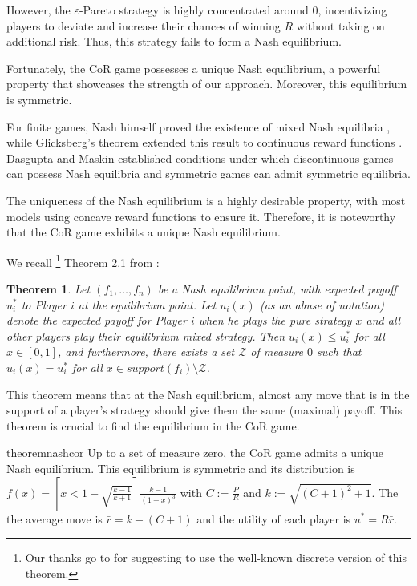 \documentclass[preprint,12pt,authoryear,doubleblind]{elsarticle}
\newtheorem{theorem}{Theorem}[section]
\theoremstyle{definition}
\newcommand{\identifier}{\censor}
\newcommand{\identifier}{}
\begin{document}
However, the $\varepsilon$-Pareto strategy is highly concentrated around $0$, incentivizing players to deviate and increase their chances of winning $R$ without taking on additional risk. Thus, this strategy fails to form a Nash equilibrium.

Fortunately, the CoR game possesses a unique Nash equilibrium, a powerful property that showcases the strength of our approach. Moreover, this equilibrium is symmetric.

For finite games, Nash himself proved the existence of mixed Nash equilibria \citep{Nash1950-jp}, while Glicksberg's theorem extended this result to continuous reward functions \citep{Glicksberg1951-wp}. Dasgupta and Maskin \citep{Dasgupta1986-gu} established conditions under which discontinuous games can possess Nash equilibria and symmetric games can admit symmetric equilibria.

The uniqueness of the Nash equilibrium is a highly desirable property, with most models using concave reward functions to ensure it. Therefore, it is noteworthy that the CoR game exhibits a unique Nash equilibrium.

We recall \footnote{Our thanks go to \identifier{Jules Pondard} for suggesting to use the well-known discrete version of this theorem.} Theorem 2.1 from \citet{Lotker2008-tx}:

\begin{theorem}
\label{thm:jules}
Let $(f_1, \ldots , f_n)$ be a Nash equilibrium point, with expected payoff $u_i^*$ to Player $i$ at the equilibrium point. Let $u_i(x)$ (as an abuse of notation) denote the expected payoff for Player $i$ when he plays the pure strategy $x$ and all other players play their equilibrium mixed strategy. Then $u_i(x) \leq u_i^*$ for all $x \in [0, 1]$, and furthermore, there exists a set $\mathcal{Z}$ of measure $0$ such that $u_i(x) = u_i^*$ for all $x \in support(f_i) \setminus \mathcal{Z}$.
\end{theorem}

This theorem means that at the Nash equilibrium, almost any move that is in the support of a player's strategy should give them the same (maximal) payoff. This theorem is crucial to find the equilibrium in the CoR game.

\begin{restatable}{theorem}{nashcor}
\label{thm:nashcor}
Up to a set of measure zero, the CoR game admits a unique Nash equilibrium. This equilibrium is symmetric and its distribution is $f(x) = \left[x < 1 - \sqrt{\frac{k - 1}{k + 1}}\right] \frac{ k - 1}{(1-x)^3}$ with $C := \frac{P}{R}$ and $k := \sqrt{(C + 1)^2 + 1}$. The the average move is $\bar r = k - (C+1)$ and the utility of each player is $u^* = R \bar r$.
\end{restatable}
\end{document}
